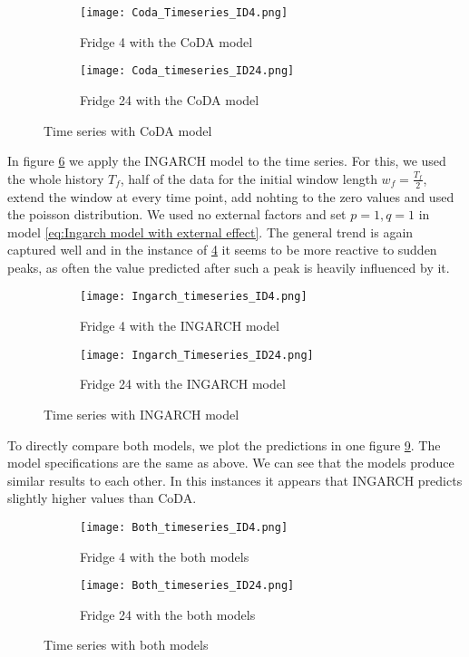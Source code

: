 \begin{figure}[htb]
\centering
\begin{subfigure}[b]{0.45\textwidth}
\texttt{[image: Coda\_Timeseries\_ID4.png]}
\caption{Fridge 4 with the CoDA model}
\label{fig:Coda Fridge 4}
\end{subfigure}
\hfill
\begin{subfigure}[b]{0.45\textwidth}
\texttt{[image: Coda\_timeseries\_ID24.png]}
\caption{Fridge 24 with the CoDA model}
\label{fig:Coda Fridge 24}
\end{subfigure}
\caption{Time series with CoDA model}
\label{fig:TS Coda}
\end{figure}



In figure \ref{fig:TS Ingarch} we apply the INGARCH model to the time series. For this, we used the whole history $T_f$, half of the data for the initial window length $w_f=\frac{T_f}{2}$, extend the window at every time point, add nohting to the zero values and used the poisson distribution. We used no external factors and set $p=1, q=1$ in model \ref{eq:Ingarch model with external effect}. The general trend is again captured well and in the instance of \ref{fig:Ingarch Fridge 4} it seems to be more reactive to sudden peaks, as often the value predicted after such a peak is heavily influenced by it.

\begin{figure}[htb]
\centering
\begin{subfigure}[b]{0.45\textwidth}
\texttt{[image: Ingarch\_timeseries\_ID4.png]}
\caption{Fridge 4 with the INGARCH model}
\label{fig:Ingarch Fridge 4}
\end{subfigure}
\hfill
\begin{subfigure}[b]{0.45\textwidth}
\texttt{[image: Ingarch\_Timeseries\_ID24.png]}
\caption{Fridge 24 with the INGARCH model}
\label{fig:Ingarch Fridge 24}
\end{subfigure}
\caption{Time series with INGARCH model}
\label{fig:TS Ingarch}
\end{figure}


To directly compare both models, we plot the predictions in one figure \ref{fig:TS Both}. The model specifications are the same as above. We can see that the models produce similar results to each other. In this instances it appears that INGARCH predicts slightly higher values than CoDA. 

\begin{figure}[htb]
\centering
\begin{subfigure}[b]{0.8\textwidth}
\texttt{[image: Both\_timeseries\_ID4.png]}
\caption{Fridge 4 with the both models}
\label{fig:Both Fridge 4}
\end{subfigure}
\hfill
\begin{subfigure}[b]{0.8\textwidth}
\texttt{[image: Both\_timeseries\_ID24.png]}
\caption{Fridge 24 with the both models}
\label{fig:Both Fridge 24}
\end{subfigure}
\caption{Time series with both models}
\label{fig:TS Both}
\end{figure}


